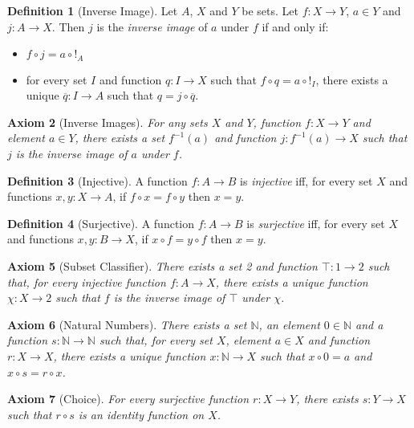 \documentclass{book}
\newtheorem{ax}{Axiom}[chapter]
\theoremstyle{definition}
\newtheorem{df}[ax]{Definition}
\begin{document}
\begin{df}[Inverse Image]
Let $A$, $X$ and $Y$ be sets. Let $f : X \rightarrow Y$, $a \in Y$ and $j : A \rightarrow X$. Then $j$ is the \emph{inverse image} of $a$ under $f$ if and only if:
\begin{itemize}
\item $f \circ j = a \circ !_A$
\item for every set $I$ and function $q : I \rightarrow X$ such that $f \circ q = a \circ !_I$, there exists a unique $\overline{q} : I \rightarrow A$ such that $q = j \circ \overline{q}$.
\end{itemize}
\end{df}

\begin{ax}[Inverse Images]
For any sets $X$ and $Y$, function $f : X \rightarrow Y$ and element $a \in Y$, there exists a set $f^{-1}(a)$ and function $j : f^{-1}(a) \rightarrow X$ such that $j$ is the inverse image of $a$ under $f$.
\end{ax}

\begin{df}[Injective]
A function $f : A \rightarrow B$ is \emph{injective} iff, for every set $X$ and functions $x,y : X \rightarrow A$, if $f \circ x = f \circ y$ then $x = y$.
\end{df}

\begin{df}[Surjective]
A function $f : A \rightarrow B$ is \emph{surjective} iff, for every set $X$ and functions $x,y : B \rightarrow X$, if $x \circ f = y \circ f$ then $x = y$.
\end{df}

\begin{ax}[Subset Classifier]
There exists a set 2 and function $\top : 1 \rightarrow 2$ such that, for every injective function $f : A \rightarrow X$, there exists a unique function $\chi : X \rightarrow 2$ such that $f$ is the inverse image of $\top$ under $\chi$.
\end{ax}

\begin{ax}[Natural Numbers]
There exists a set $\mathbb{N}$, an element $0 \in \mathbb{N}$ and a function $s : \mathbb{N} \rightarrow \mathbb{N}$ such that, for every set $X$, element $a \in X$ and function $r : X \rightarrow X$, there exists a unique function $x : \mathbb{N} \rightarrow X$ such that $x \circ 0 = a$ and $x \circ s = r \circ x$.
\end{ax}

\begin{ax}[Choice]
For every surjective function $r : X \rightarrow Y$, there exists $s : Y \rightarrow X$ such that $r \circ s$ is an identity function on $X$.
\end{ax}
\end{document}
